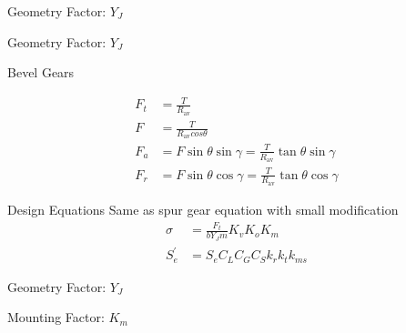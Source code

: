 \documentclass[a4paper,openany]{tufte-book}
\begin{document}
Geometry Factor: \(Y_{J}\)

Geometry Factor: \(Y_{J}\)

Bevel Gears

\begin{align}
        F_{t} &= \frac{T}{R_{\text{av}}} \\
        F &= \frac{T}{R_{\text{av}} cos \theta} \\
        F_{a} &= F \sin \theta \sin \gamma = \frac{T}{R_{\text{av}}} \tan \theta \sin \gamma \\
        F_{r} &= F \sin \theta \cos \gamma = \frac{T}{R_{\text{av}}} \tan \theta \cos \gamma
      \end{align}

Design Equations Same as spur gear equation with small modification
\begin{align}
    \sigma &= \frac{F_{t}}{bY_{J}m} K_{v} K_{o} K_{m} \\
    S_{e}^{\prime} &= S_{e}C_{L}C_{G}C_{S}k_{r}k_{t}k_{ms}
  \end{align}

Geometry Factor: \(Y_{J}\)

Mounting Factor: \(K_{m}\)
\end{document}
